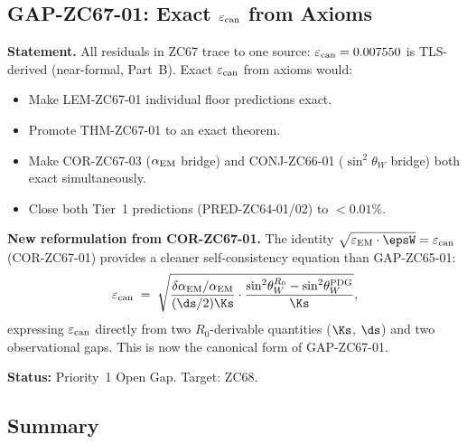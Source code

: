 \documentclass[12pt, a4paper]{article}
\renewcommand{\epsEM}{\varepsilon_{\rm EM}}
\renewcommand{\epscan}{\varepsilon_{\rm can}}
\renewcommand{\swsq}{\sin^2\!\theta_W}
\renewcommand{\aEM}{\alpha_{\rm EM}}
\begin{document}
\subsection{GAP-ZC67-01: Exact $\varepsilon_{\rm can}$ from Axioms}
\label{sec:gap}

\begin{openqbox}[title={GAP-ZC67-01: Exact $\epscan$ from Axioms
  (Inherited from GAP-ZC65-01, Priority~1)}]

\textbf{Statement.}
All residuals in ZC67 trace to one source: $\epscan = 0.007550$
is TLS-derived (near-formal, Part~B).
Exact $\epscan$ from axioms would:
\begin{itemize}[leftmargin=2em, noitemsep]
  \item Make LEM-ZC67-01 individual floor predictions exact.
  \item Promote THM-ZC67-01 to an exact theorem.
  \item Make COR-ZC67-03 ($\aEM$ bridge) and CONJ-ZC66-01
    ($\swsq$ bridge) both exact simultaneously.
  \item Close both Tier~1 predictions (PRED-ZC64-01/02)
    to $<0.01\%$.
\end{itemize}

\textbf{New reformulation from COR-ZC67-01.}
The identity $\sqrt{\epsEM\cdot\epsW} = \epscan$ (COR-ZC67-01)
provides a cleaner self-consistency equation than GAP-ZC65-01:
\[
  \epscan
  \;=\;
  \sqrt{
    \frac{\delta\aEM/\aEM}{(\ds/2)\Ks}
    \cdot
    \frac{\swsq^{R_0} - \swsq^{\rm PDG}}{\Ks}
  },
\]
expressing $\epscan$ directly from two $R_0$-derivable
quantities ($\Ks$, $\ds$) and two observational gaps.
This is now the canonical form of GAP-ZC67-01.

\textbf{Status:} Priority~1 Open Gap. Target: ZC68.
\end{openqbox}

\subsection{Summary}
\label{sec:summary}
\end{document}
